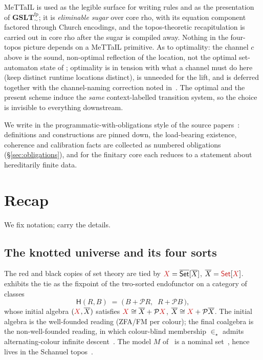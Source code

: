 \documentclass[11pt]{article}
\newcommand{\GSLTfp}{\mathbf{GSLT}^{\mathrm{fp}}_{\!\sim}}
\newcommand{\Ps}{\mathcal{P}}
\newcommand{\rc}[1]{\textcolor{redcopy}{#1}}   %
\newcommand{\rSet}{\rc{\mathsf{Set}}}          %
\newcommand{\bSet}{\overline{\mathsf{Set}}}    %
\newcommand{\rX}{\rc{X}}
\theoremstyle{plain}
\theoremstyle{definition}
\theoremstyle{remark}
\begin{document}
MeTTaIL is used as the legible surface for writing rules and as the presentation of $\GSLTfp$; it is
\emph{eliminable sugar} over core rho, with its equation component factored through Church encodings,
and the topos-theoretic recapitulation is carried out in core rho after the sugar is compiled away.
Nothing in the four-topos picture depends on a MeTTaIL primitive. As to optimality: the channel
$c$ above is the sound, non-optimal reflection of the location, not the optimal set-automaton state of
\cite{optimal}; optimality is in tension with what a channel must do here (keep distinct runtime
locations distinct), is unneeded for the lift, and is deferred together with the channel-naming
correction noted in~\cite{optimal}. The optimal and the present scheme induce the \emph{same}
context-labelled transition system, so the choice is invisible to everything downstream.

We write in the programmatic-with-obligations style of the source papers~\cite{rset,knotrho}:
definitions and constructions are pinned down, the load-bearing existence, coherence and calibration
facts are collected as numbered obligations (\S\ref{sec:obligations}), and for the finitary core each
reduces to a statement about hereditarily finite data.

\section{Recap}\label{sec:recap}

We fix notation; \cite{rset,knotrho,gsltnotes} carry the details.

\subsection{The knotted universe and its four sorts}

The red and black copies of set theory are tied by $\rX=\bSet[\overline X]$,
$\overline X=\rSet[\rX]$. \cite[\S8.1]{rset} exhibits the tie as the fixpoint of the two-sorted
endofunctor on a category of classes
\begin{equation}\label{eq:H}
\mathsf{H}(R,B)\;=\;\bigl(\,B + \Ps R,\;\; R + \Ps B\,\bigr),
\end{equation}
whose initial algebra $(\rX,\overline X)$ satisfies $\rX\cong\overline X+\Ps \rX$,
$\overline X\cong \rX+\Ps\overline X$. The initial algebra is the well-founded reading (ZFA/FM per
colour); the final coalgebra is the non-well-founded reading, in which colour-blind membership
$\in_\star$ admits alternating-colour infinite descent~\cite[\S7]{rset}. The model
$M$ of~\cite[Thm.~1]{rset} is a nominal set~\cite{gabbaypitts,pitts}, hence lives in the Schanuel topos~\cite[\S6.1]{rset}.
\end{document}
